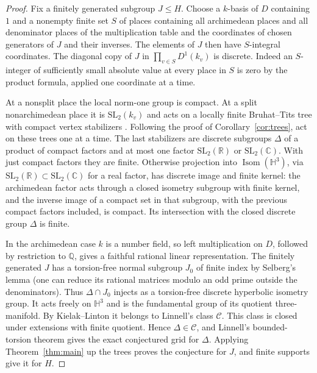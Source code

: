 \documentclass[11pt,a4paper,reqno]{amsart}
\numberwithin{equation}{section}
\theoremstyle{remark}
\newcommand{\C}{\mathbb C}
\newcommand{\Q}{\mathbb Q}
\newcommand{\R}{\mathbb R}
\begin{document}
\begin{proof}
Fix a finitely generated subgroup \(J\le H\). Choose a \(k\)-basis of \(D\) containing \(1\) and a nonempty finite set \(S\) of places containing all archimedean places and all denominator places of the multiplication table and the coordinates of chosen generators of \(J\) and their inverses. The elements of \(J\) then have \(S\)-integral coordinates. The diagonal copy of \(J\) in \(\prod_{v\in S}D^1(k_v)\) is discrete. Indeed an \(S\)-integer of sufficiently small absolute value at every place in \(S\) is zero by the product formula, applied one coordinate at a time.

At a nonsplit place the local norm-one group is compact. At a split nonarchimedean place it is \(\mathrm{SL}_2(k_v)\) and acts on a locally finite Bruhat--Tits tree with compact vertex stabilizers \cite{Serre,Voight}. Following the proof of Corollary~\ref{cor:trees}, act on these trees one at a time. The last stabilizers are discrete subgroups \(\Delta\) of a product of compact factors and at most one factor \(\mathrm{SL}_2(\R)\) or \(\mathrm{SL}_2(\C)\). With just compact factors they are finite. Otherwise projection into \(\operatorname{Isom}(\mathbb H^3)\), via \(\mathrm{SL}_2(\R)\subset\mathrm{SL}_2(\C)\) for a real factor, has discrete image and finite kernel: the archimedean factor acts through a closed isometry subgroup with finite kernel, and the inverse image of a compact set in that subgroup, with the previous compact factors included, is compact. Its intersection with the closed discrete group \(\Delta\) is finite.

In the archimedean case \(k\) is a number field, so left multiplication on \(D\), followed by restriction to \(\Q\), gives a faithful rational linear representation. The finitely generated \(J\) has a torsion-free normal subgroup \(J_0\) of finite index by Selberg's lemma (one can reduce its rational matrices modulo an odd prime outside the denominators). Thus \(\Delta\cap J_0\) injects as a torsion-free discrete hyperbolic isometry group. It acts freely on \(\mathbb H^3\) and is the fundamental group of its quotient three-manifold. By Kielak--Linton \cite[Theorem~1.4]{KL} it belongs to Linnell's class \(\mathcal C\). This class is closed under extensions with finite quotient. Hence \(\Delta\in\mathcal C\), and Linnell's bounded-torsion theorem \cite[Theorem~1.5]{Linnell} gives the exact conjectured grid for \(\Delta\). Applying Theorem~\ref{thm:main} up the trees proves the conjecture for \(J\), and finite supports give it for \(H\).


\end{proof}
\end{document}
